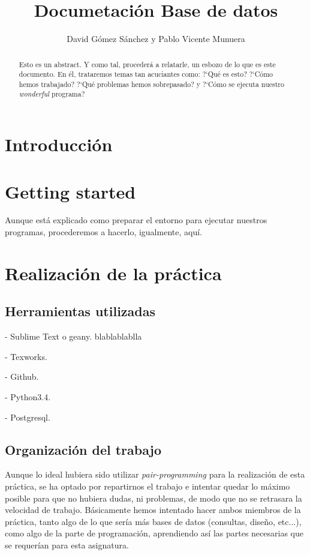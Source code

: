\documentclass[11pt]{article} %
\title{Documetaci\'on Base de datos}
\author{David G\'omez S\'anchez y Pablo Vicente Munuera}
\date{} %
\begin{document}
\maketitle

\begin{abstract}

Esto es un abstract. Y como tal, proceder\'a a relatarle, un esbozo de lo que es este documento. En él, trataremos temas tan acuciantes como: ?`Qu\'e es esto? ?`C\'omo hemos trabajado? ?`Qu\'e problemas hemos sobrepasado? y ?`C\'omo se ejecuta nuestro \emph{wonderful} programa?

\end{abstract}

\section{Introducci\'on}



\section{Getting started}

Aunque est\'a explicado como preparar el entorno para ejecutar nuestros programas, procederemos a hacerlo, igualmente, aqu\'i.

\section{Realizaci\'on de la pr\'actica}

\subsection{Herramientas utilizadas}

- Sublime Text o geany. blablablablla

- Texworks.

- Github.

- Python3.4.

- Postgresql.

\subsection{Organizaci\'on del trabajo}

Aunque lo ideal hubiera sido utilizar \emph{pair-programming} para la realizaci\'on de esta pr\'actica, se ha optado por repartirnos el trabajo e intentar quedar lo m\'aximo posible para que no hubiera dudas, ni problemas, de modo que no se retrasara la velocidad de trabajo. B\'asicamente hemos intentado hacer ambos miembros de la pr\'actica, tanto algo de lo que ser\'ia m\'as bases de datos (consultas, dise\~no, etc...), como algo de la parte de programaci\'on, aprendiendo as\'i las partes necesarias que se requer\'ian para esta asignatura.
\end{document}
